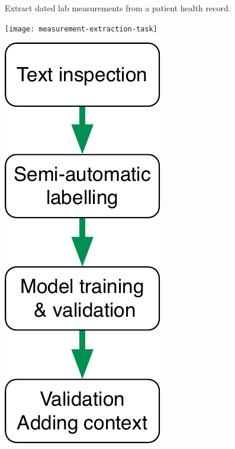 \documentclass[landscape,footrule]{foils}
\begin{document}

Extract dated lab measurements from a patient health record.\vspace*{1cm}


\centerline{\texttt{[image: measurement-extraction-task]}}





\includegraphics[scale=1.0, trim= 0cm -0.25cm 0cm 0cm, clip]{steps-in-fact-extraction-task}\hspace*{0.5cm}
\end{document}
